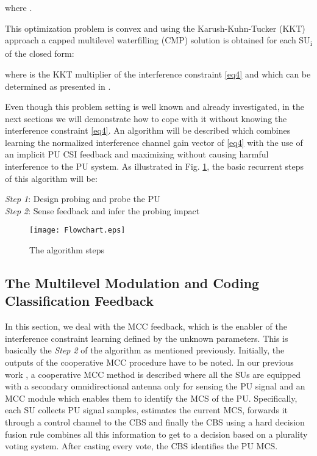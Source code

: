 \documentclass[journal]{IEEEtran}
\begin{document}
where .

This optimization problem is convex and using the Karush-Kuhn-Tucker (KKT) approach a capped multilevel waterfilling (CMP) solution is obtained \cite{biban70} for each SU\textsubscript{i} of the closed form:

where  is the KKT multiplier of the interference constraint \eqref{eq4} and which can be determined as presented in \cite{biban70}.

Even though this problem setting is well known and already investigated, in the next sections we will demonstrate how to cope with it without knowing the interference constraint \eqref{eq4}. An algorithm will be described which combines learning the normalized interference channel gain vector  of \eqref{eq4} with the use of an implicit PU CSI feedback and maximizing  without causing harmful interference to the PU system. As illustrated in Fig. \ref{fig12}, the basic recurrent steps of this algorithm will be:

\begin{description}
  \item[]
  \item[\textit{Step 1}: Design probing and probe the PU]
  \item[]
  \item[\textit{Step 2}: Sense feedback and infer the probing impact]
  \item[]
\end{description}

\begin{figure}[ht!]
\centering
\texttt{[image: Flowchart.eps]}
\caption{The algorithm steps}
\label{fig12}
\end{figure}

\subsection{The Multilevel Modulation and Coding Classification Feedback}

In this section, we deal with the MCC feedback, which is the enabler of the interference constraint learning defined by the unknown  parameters. This is basically the \textit{Step 2} of the algorithm as mentioned previously. Initially, the outputs of the cooperative MCC procedure have to be noted. In our previous work \cite{biban80}, a cooperative MCC method is described where all the SUs are equipped with a secondary omnidirectional antenna only for sensing the PU signal and an MCC module which enables them to identify the MCS of the PU. Specifically, each SU collects PU signal samples, estimates the current MCS, forwards it through a control channel to the CBS and finally the CBS using a hard decision fusion rule combines all this information to get to a decision based on a plurality voting system. After casting every vote, the CBS identifies the PU MCS.
\end{document}
